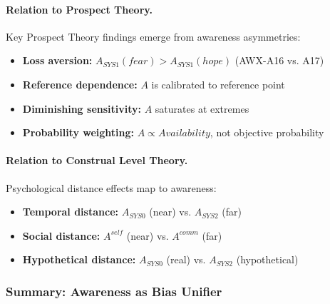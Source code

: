 \paragraph{Relation to Prospect Theory.}
Key Prospect Theory findings emerge from awareness asymmetries:

\begin{itemize}
\item \textbf{Loss aversion:} $A_{SYS1}(fear) > A_{SYS1}(hope)$ (AWX-A16 vs. A17)
\item \textbf{Reference dependence:} $A$ is calibrated to reference point
\item \textbf{Diminishing sensitivity:} $A$ saturates at extremes
\item \textbf{Probability weighting:} $A \propto Availability$, not objective probability
\end{itemize}

\paragraph{Relation to Construal Level Theory.}
Psychological distance effects map to awareness:

\begin{itemize}
\item \textbf{Temporal distance:} $A_{SYS0}$ (near) vs. $A_{SYS2}$ (far)
\item \textbf{Social distance:} $A^{self}$ (near) vs. $A^{comm}$ (far)
\item \textbf{Hypothetical distance:} $A_{SYS0}$ (real) vs. $A_{SYS2}$ (hypothetical)
\end{itemize}

\subsubsection{Summary: Awareness as Bias Unifier}

